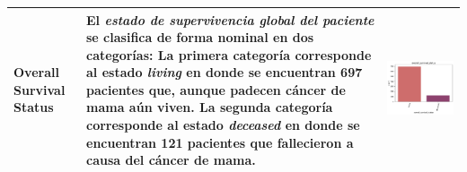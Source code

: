 \begin{table}[!htb]
\begin{threeparttable}
\begin{tabular}{p{2.5cm} p{7cm} p{6.5cm}}
			Overall Survival Status
			& El \textit{estado de supervivencia global del paciente} se clasifica de forma nominal en dos categorías: La primera categoría corresponde al estado \textit{living} en donde se encuentran 697 pacientes que, aunque padecen cáncer de mama aún viven. La segunda categoría corresponde al estado \textit{deceased} en donde se encuentran 121 pacientes que fallecieron a causa del cáncer de mama. 
			& \begin{center}\includegraphics[width=1\linewidth]{NOTEBOOK/IMAGENES_DESCRIPTIVAS/33_overall_survival_status}\end{center}
			\\ \hline
			
		\end{tabular}
	\end{threeparttable}
\end{table}

